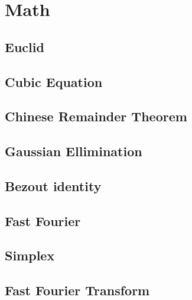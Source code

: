 \newpage
\section{Math}

\subsection{Euclid}
 

\subsection{Cubic Equation}


\subsection{Chinese Remainder Theorem}
\subsection{Gaussian Ellimination}


\subsection{Bezout identity}
\subsection{Fast Fourier}

\subsection{Simplex}


\subsection{Fast Fourier Transform}
